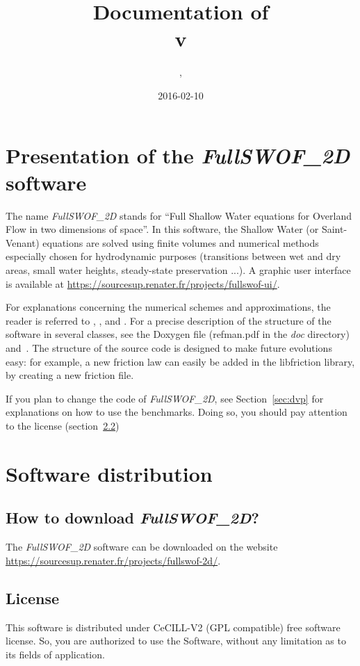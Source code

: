 \documentclass[a4paper, 11pt]{article}
\title{Documentation of \FullSWOF \\v\version}
\author{\contactFullName, \contactEmail}
\date{2016-02-10} %
\newcommand{\FullSWOF}{\emph{FullSWOF\_2D}}
\newcommand{\MainWebSite}{\url{https://sourcesup.renater.fr/projects/fullswof-2d/}}
\begin{document}
\maketitle

\thispagestyle{fancy}

\tableofcontents

\section{Presentation of the \FullSWOF{} software}

The name \FullSWOF{} stands for ``Full Shallow Water equations for Overland Flow in two 
dimensions of space''. In this software, the Shallow Water (or Saint-Venant) equations are solved 
using finite volumes and numerical methods especially chosen for hydrodynamic purposes 
(transitions between wet and dry areas, small water heights, steady-state preservation ...).
A graphic user interface is available at \url{https://sourcesup.renater.fr/projects/fullswof-ui/}.

For explanations concerning the numerical schemes 
and approximations, the reader is referred to \cite{Delestre14}, \cite{Delestre10b}, \cite{Delestre09} and \cite{DelestreJames09}.
For a precise description of the structure of the software in several classes, see the Doxygen file (refman.pdf in the \textit{doc} directory) and~\cite{Delestre08}. 
The structure  of the source code is designed to make future evolutions easy: for example, a new friction law can easily 
be added in the libfriction library, by creating a new friction file.

If you plan to change the code of \FullSWOF, 
see Section~\ref{sec:dvp} for explanations on how to use the benchmarks.
Doing so, you should pay attention to the license (section~\ref{sec:license})

\section{Software distribution}

\subsection{How to download \FullSWOF?}
The \FullSWOF{} software can be downloaded on the website \MainWebSite.

\subsection{License}\label{sec:license}
This software is distributed under CeCILL-V2 (GPL compatible) free software license. So, you are  authorized to use the Software, without any limitation as to its fields of application.
\end{document}
